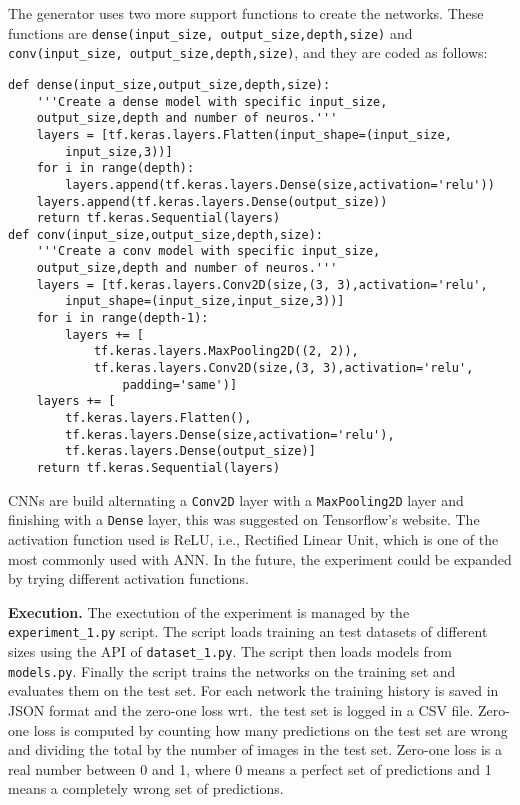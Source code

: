 The generator uses two more support functions to create the networks. These functions are \texttt{dense(input\_size, output\_size,depth,size)} and \texttt{conv(input\_size, output\_size,depth,size)}, and they are coded as follows:
\begin{verbatim}
def dense(input_size,output_size,depth,size):
    '''Create a dense model with specific input_size,
    output_size,depth and number of neuros.'''
    layers = [tf.keras.layers.Flatten(input_shape=(input_size,
        input_size,3))]
    for i in range(depth):
        layers.append(tf.keras.layers.Dense(size,activation='relu'))
    layers.append(tf.keras.layers.Dense(output_size))
    return tf.keras.Sequential(layers)
def conv(input_size,output_size,depth,size):
    '''Create a conv model with specific input_size,
    output_size,depth and number of neuros.'''
    layers = [tf.keras.layers.Conv2D(size,(3, 3),activation='relu',
        input_shape=(input_size,input_size,3))]
    for i in range(depth-1):
        layers += [
            tf.keras.layers.MaxPooling2D((2, 2)),
            tf.keras.layers.Conv2D(size,(3, 3),activation='relu',
                padding='same')]
    layers += [
        tf.keras.layers.Flatten(),
        tf.keras.layers.Dense(size,activation='relu'),
        tf.keras.layers.Dense(output_size)]
    return tf.keras.Sequential(layers)
\end{verbatim}
CNNs are build alternating a \texttt{Conv2D} layer with a \texttt{MaxPooling2D} layer and finishing with a \texttt{Dense} layer, this was suggested on Tensorflow's website. The activation function used is ReLU, i.e., Rectified Linear Unit, which is one of the most commonly used with ANN. In the future, the experiment could be expanded by trying different activation functions.

\textbf{Execution.}
The exectution of the experiment is managed by the \texttt{experiment\_1.py} script. The script loads training an test datasets of different sizes using the API of \texttt{dataset\_1.py}. The script then loads models from \texttt{models.py}. Finally the script trains the networks on the training set and evaluates them on the test set. For each network the training history is saved in JSON format and the zero-one loss wrt.~the test set is logged in a CSV file. Zero-one loss is computed by counting how many predictions on the test set are wrong and dividing the total by the number of images in the test set. Zero-one loss is a real number between 0 and 1, where 0 means a perfect set of predictions and 1 means a completely wrong set of predictions.

